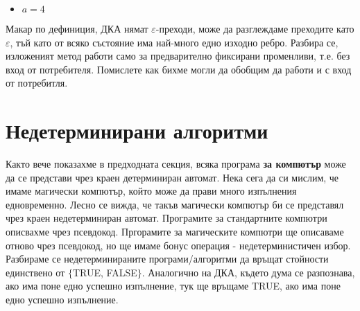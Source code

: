 \begin{examplecp}
\begin{itemize}
\begin{figure}[H]
{}
		\end{figure}
		
		\item $a=4$
		\begin{figure}[H]
			\centering
		\end{figure}
	\end{itemize}
	\noindent
	Макар по дефиниция, ДКА нямат $\varepsilon$-преходи, може да разглеждаме преходите като $\varepsilon$, тъй като от всяко състояние има най-много едно изходно ребро. Разбира се, изложеният метод работи само за предварително фиксирани променливи, т.е. без вход от потребителя. Помислете как бихме могли да обобщим да работи и с вход от потребитля.
\end{examplecp}%

\section{Недетерминирани алгоритми}

Както вече показахме в предходната секция, всяка програма \textbf{за компютър} може да се представи чрез краен детерминиран автомат. Нека сега да си мислим, че имаме магически компютър, който може да прави много изпълнения едновременно. Лесно се вижда, че такъв магически компютър би се представял чрез краен недетерминиран автомат. Програмите за стандартните компютри описвахме чрез псевдокод. Пргорамите за магическите компютри ще описаваме отново чрез псевдокод, но ще имаме бонус операция - недетерминистичен избор. Разбираме се недетерминираните програми/алгоритми да връщат стойности единствено от $\{$TRUE, FALSE$\}$. Аналогично на ДКА, където дума се разпознава, ако има поне едно успешно изпълнение, тук ще връщаме TRUE, ако има поне едно успешно изпълнение.

